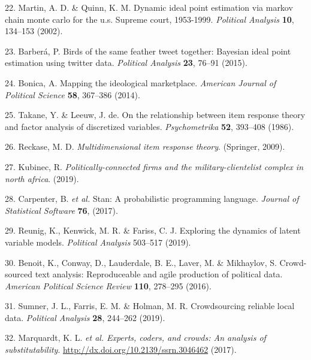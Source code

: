 \documentclass[
]{article}
\newenvironment{cslreferences}%
  {}%
  {\par}
\begin{document}
\begin{cslreferences}
\leavevmode\hypertarget{ref-quinn2002}{}%
22. Martin, A. D. \& Quinn, K. M. Dynamic ideal point estimation via markov chain monte carlo for the u.s. Supreme court, 1953-1999. \emph{Political Analysis} \textbf{10}, 134--153 (2002).

\leavevmode\hypertarget{ref-barbera2015}{}%
23. Barberá, P. Birds of the same feather tweet together: Bayesian ideal point estimation using twitter data. \emph{Political Analysis} \textbf{23}, 76--91 (2015).

\leavevmode\hypertarget{ref-bonica2014}{}%
24. Bonica, A. Mapping the ideological marketplace. \emph{American Journal of Political Science} \textbf{58}, 367--386 (2014).

\leavevmode\hypertarget{ref-takane1986}{}%
25. Takane, Y. \& Leeuw, J. de. On the relationship between item response theory and factor analysis of discretized variables. \emph{Psychometrika} \textbf{52}, 393--408 (1986).

\leavevmode\hypertarget{ref-reckase2009}{}%
26. Reckase, M. D. \emph{Multidimensional item response theory}. (Springer, 2009).

\leavevmode\hypertarget{ref-kubinec2019}{}%
27. Kubinec, R. \emph{Politically-connected firms and the military-clientelist complex in north africa}. (2019).

\leavevmode\hypertarget{ref-carpenter2017}{}%
28. Carpenter, B. \emph{et al.} Stan: A probabilistic programming language. \emph{Journal of Statistical Software} \textbf{76}, (2017).

\leavevmode\hypertarget{ref-reunig2019}{}%
29. Reunig, K., Kenwick, M. R. \& Fariss, C. J. Exploring the dynamics of latent variable models. \emph{Political Analysis} 503--517 (2019).

\leavevmode\hypertarget{ref-benoitetal2016}{}%
30. Benoit, K., Conway, D., Lauderdale, B. E., Laver, M. \& Mikhaylov, S. Crowd-sourced text analysis: Reproduceable and agile production of political data. \emph{American Political Science Review} \textbf{110}, 278--295 (2016).

\leavevmode\hypertarget{ref-sumneretal2019}{}%
31. Sumner, J. L., Farris, E. M. \& Holman, M. R. Crowdsourcing reliable local data. \emph{Political Analysis} \textbf{28}, 244--262 (2019).

\leavevmode\hypertarget{ref-marquardtetal2017}{}%
32. Marquardt, K. L. \emph{et al.} \emph{Experts, coders, and crowds: An analysis of substitutability}. \url{http://dx.doi.org/10.2139/ssrn.3046462} (2017).


\end{cslreferences}
\end{document}
